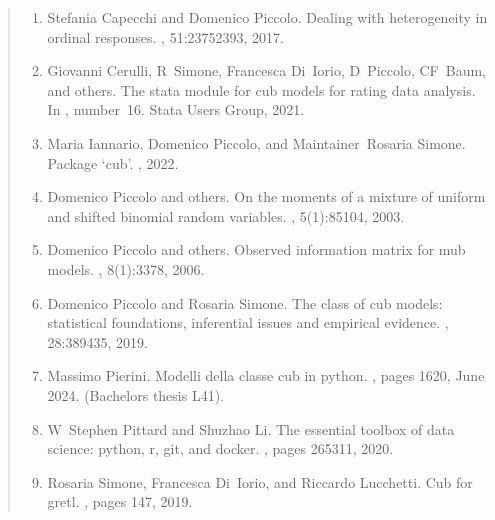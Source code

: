 \documentclass[letterpaper,10pt,english]{sphinxmanual}
\begin{document}
\label{\detokenize{cubmods:id203}}\begin{quote}
\begin{enumerate}
%
\setcounter{enumi}{0}
\item {} 
\sphinxAtStartPar
Stefania Capecchi and Domenico Piccolo. Dealing with heterogeneity in ordinal responses. , 51:2375\textendash{}2393, 2017.

\item {} 
\sphinxAtStartPar
Giovanni Cerulli, R Simone, Francesca Di Iorio, D Piccolo, CF Baum, and others. The stata module for cub models for rating data analysis. In , number 16. Stata Users Group, 2021.

\item {} 
\sphinxAtStartPar
Maria Iannario, Domenico Piccolo, and Maintainer Rosaria Simone. Package ‘cub’. , 2022.

\item {} 
\sphinxAtStartPar
Domenico Piccolo and others. On the moments of a mixture of uniform and shifted binomial random variables. , 5(1):85\textendash{}104, 2003.

\item {} 
\sphinxAtStartPar
Domenico Piccolo and others. Observed information matrix for mub models. , 8(1):33\textendash{}78, 2006.

\item {} 
\sphinxAtStartPar
Domenico Piccolo and Rosaria Simone. The class of cub models: statistical foundations, inferential issues and empirical evidence. , 28:389\textendash{}435, 2019.

\item {} 
\sphinxAtStartPar
Massimo Pierini. Modelli della classe cub in python. , pages 16\textendash{}20, June 2024. (Bachelor\textquotesingle{}s thesis L\sphinxhyphen{}41).

\item {} 
\sphinxAtStartPar
W Stephen Pittard and Shuzhao Li. The essential toolbox of data science: python, r, git, and docker. , pages 265\textendash{}311, 2020.

\item {} 
\sphinxAtStartPar
Rosaria Simone, Francesca Di Iorio, and Riccardo Lucchetti. Cub for gretl. , pages 147, 2019.

\end{enumerate}
\end{quote}
\end{document}
